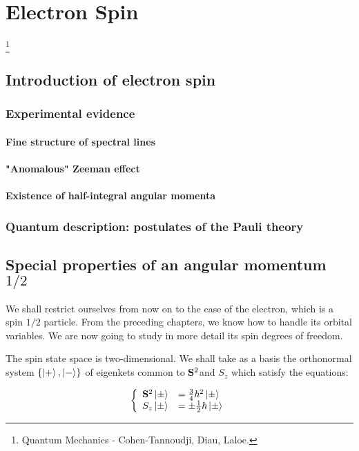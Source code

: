 \chapter{Electron Spin}\footnote{Quantum Mechanics - Cohen-Tannoudji, Diau, Laloe.}
\section{Introduction of electron spin}
\subsection{Experimental evidence}
\subsubsection{Fine structure of spectral lines}
\subsubsection{"Anomalous" Zeeman effect}
\subsubsection{Existence of half-integral angular momenta}

\subsection{Quantum description: postulates of the Pauli theory}

\section{Special properties of an angular momentum $1/2$}
We shall restrict ourselves from now on to the case of the electron, which is a spin $1/2$ particle. From the preceding chapters, we know how to handle its orbital variables. We are now going to study in more detail its spin degrees of freedom.

The spin state space is two-dimensional. We shall take as a basis the orthonormal system $\{\ket{+}, \ket{-}\}$ of eigenkets common to $\vb{S}^2$and $S_z$ which satisfy the equations:

\begin{equation}\label{B-1}
	\left \{
		\begin{array}{ll}
			\vb{S}^{2}\ket{\pm}&=\frac{3}{4}\hbar^2\ket{\pm}\\
			S_z\ket{\pm}&=\pm\frac{1}{2}\hbar\ket{\pm}
		\end{array}
	\right.
\end{equation}


